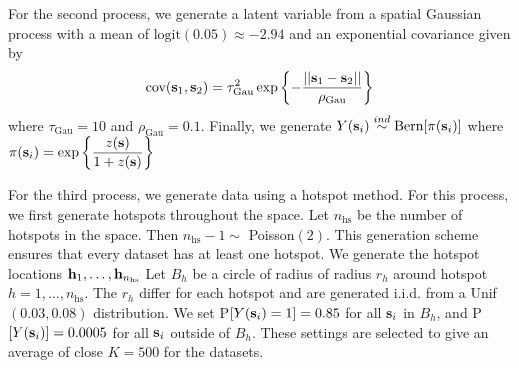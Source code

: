 \documentclass[11pt]{article}
\begin{document}
For the second process, we generate a latent variable from a spatial Gaussian process with a mean of $\text{logit}(0.05) \approx -2.94$ and an exponential covariance given by
\begin{align}
  \text{cov}(\mbox{\bf s}_1, \mbox{\bf s}_2) = \tau_\text{Gau}^2 \exp\left\{- \frac{||\mbox{\bf s}_1 - \mbox{\bf s}_2||}{\rho_\text{Gau}}\right\}
\end{align}
where $\tau_\text{Gau} = 10$ and $\rho_\text{Gau} = 0.1$.
Finally, we generate $Y(\mbox{\bf s}_i) \stackrel{ind}{\sim} \text{Bern}[\pi(\mbox{\bf s}_i)]$
where $\pi(\mbox{\bf s}_i) = \exp\left\{ \displaystyle \frac{z(\mbox{\bf s})}{1 + z(\mbox{\bf s})} \right\}$

For the third process, we generate data using a hotspot method.
For this process, we first generate hotspots throughout the space.
Let $n_\text{hs}$ be the number of hotspots in the space.
Then $n_\text{hs} - 1 \sim$ Poisson$(2)$.
This generation scheme ensures that every dataset has at least one hotspot.
We generate the hotspot locations $\mbox{\bf h}_1, \ldots, \mbox{\bf h}_{n_\text{hs}}$
Let $B_h$ be a circle of radius of radius $r_h$ around hotspot $h = 1, \ldots, n_\text{hs}$.
The $r_h$ differ for each hotspot and are generated i.i.d. from a Unif$(0.03, 0.08)$ distribution.
We set P$[Y(\mbox{\bf s}_i) = 1] = 0.85$ for all $\mbox{\bf s}_i$ in $B_h$, and P$[Y(\mbox{\bf s}_i)] = 0.0005$ for all $\mbox{\bf s}_i$ outside of $B_h$.
These settings are selected to give an average of close $K = 500$ for the datasets.
\end{document}
